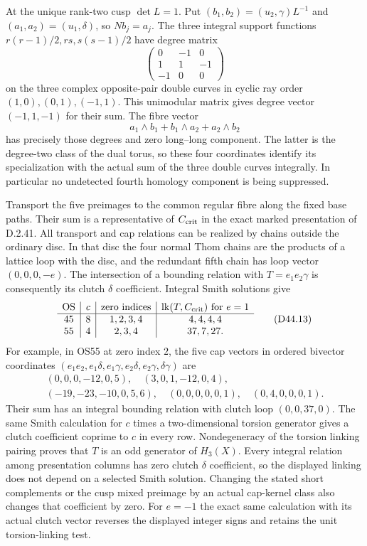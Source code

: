 At the unique rank-two cusp $\det L=1$. Put
$(b_1,b_2)=(u_2,\gamma)L^{-1}$ and $(a_1,a_2)=(u_1,\delta)$,
so $Nb_j=a_j$. The three integral support functions
$r(r-1)/2,rs,s(s-1)/2$ have degree matrix
\[
 \begin{pmatrix}0&-1&0\\1&1&-1\\-1&0&0\end{pmatrix}          \tag{D44.11}
\]
on the three complex opposite-pair double curves in cyclic
ray order $(1,0),(0,1),(-1,1)$. This unimodular matrix gives
degree vector $(-1,1,-1)$ for their sum. The fibre vector
\[
 a_1\wedge b_1+b_1\wedge a_2+a_2\wedge b_2                  \tag{D44.12}
\]
has precisely those degrees and zero long--long component.
The latter is the degree-two class of the dual torus, so these
four coordinates identify its specialization with the actual
sum of the three double curves integrally. In particular no
undetected fourth homology component is being suppressed.

Transport the five preimages to the common regular fibre along
the fixed base paths. Their sum is a representative of
$C_{\rm crit}$ in the exact marked presentation of D.2.41.
All transport and cap relations can be realized by chains
outside the ordinary disc. In that disc the four normal
Thom chains are the products of a lattice loop with the
disc, and the redundant fifth chain has loop vector
$(0,0,0,-e)$. The intersection of a bounding relation with
$T=e_1e_2\gamma$ is consequently its clutch $\delta$
coefficient. Integral Smith solutions give
\[
 \begin{array}{c|c|c|c}
  \mathrm{OS}&c&\text{zero indices}&
       \operatorname{lk}(T,C_{\rm crit})\text{ for }e=1\\\hline
  45&8&1,2,3,4&4,4,4,4\\
  55&4&2,3,4&37,7,27.
 \end{array}                                                  \tag{D44.13}
\]
For example, in OS55 at zero index $2$, the five cap vectors
in ordered bivector coordinates
$(e_1e_2,e_1\delta,e_1\gamma,e_2\delta,e_2\gamma,\delta\gamma)$
are
\[
 \begin{gathered}
 (0,0,0,-12,0,5),\quad(3,0,1,-12,0,4),\\
 (-19,-23,-10,0,5,6),\quad(0,0,0,0,0,1),\quad(0,4,0,0,0,1).
 \end{gathered}                                               \tag{D44.14}
\]
Their sum has an integral bounding relation with clutch loop
$(0,0,37,0)$. The same Smith calculation for $c$ times a
two-dimensional torsion generator gives a clutch coefficient
coprime to $c$ in every row. Nondegeneracy of the torsion
linking pairing proves that $T$ is an odd generator of
$H_3(X)$. Every integral relation among presentation columns
has zero clutch $\delta$ coefficient, so the displayed
linking does not depend on a selected Smith solution.
Changing the stated short complements or the cusp mixed
preimage by an actual cap-kernel class also changes that
coefficient by zero. For $e=-1$ the exact same calculation
with its actual clutch vector reverses the displayed integer
signs and retains the unit torsion-linking test.

